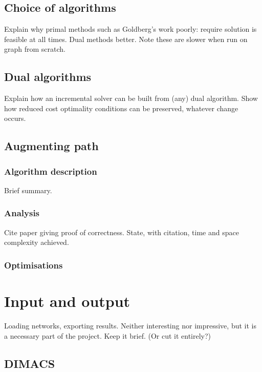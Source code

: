 \subsection{Choice of algorithms}

Explain why primal methods such as Goldberg's work poorly: require solution is feasible at all times. Dual methods better. Note these are slower when run on graph from scratch.

\subsection{Dual algorithms}

Explain how an incremental solver can be built from (any) dual algorithm. Show how reduced cost optimality conditions can be preserved, whatever change occurs.

\subsection{Augmenting path}

\subsubsection{Algorithm description}

Brief summary.

\subsubsection{Analysis}

Cite paper giving proof of correctness. State, with citation, time and space complexity achieved.

\subsubsection{Optimisations}

\section{Input and output}


Loading networks, exporting results. Neither interesting nor impressive, but it is a necessary part of the project. Keep it brief. (Or cut it entirely?)

\subsection{DIMACS}

